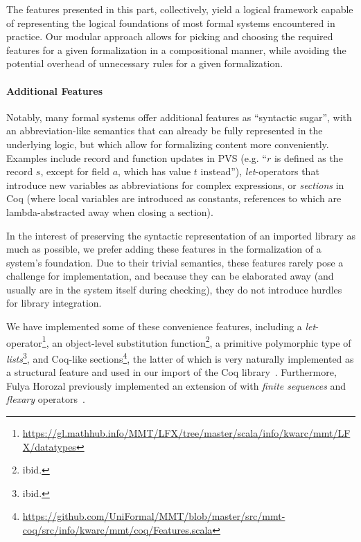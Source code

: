 The features presented in this part, collectively, yield a logical framework capable of representing the logical foundations of most formal systems encountered in practice. Our modular approach allows for picking and choosing the required features for a given formalization in a compositional manner, while avoiding the potential overhead of unnecessary rules for a given formalization.\medskip


\paragraph{Additional Features} Notably, many formal systems offer additional features as ``syntactic sugar'', with an abbreviation-like semantics that can already be fully represented in the underlying logic, but which allow for formalizing content more conveniently. Examples include record and function updates in PVS (e.g. ``$r$ is defined as the record $s$, except for field $a$, which has value $t$ instead''), \emph{let}-operators that introduce new variables as abbreviations for complex expressions, or \emph{sections} in Coq (where local variables are introduced as constants, references to which are lambda-abstracted away when closing a section).

In the interest of preserving the syntactic representation of an imported library as much as possible, we prefer adding these features in the formalization of a system's foundation. Due to their trivial semantics, these features rarely pose a challenge for implementation, and because they can be elaborated away (and usually are in the system itself during checking), they do not introduce hurdles for library integration.

We have implemented some of these convenience features, including a \emph{let}-operator\footnote{\url{https://gl.mathhub.info/MMT/LFX/tree/master/scala/info/kwarc/mmt/LFX/datatypes}}, an object-level substitution function\footnote{ibid.}, a primitive polymorphic type of \emph{lists}\footnote{ibid.}, and Coq-like sections\footnote{\url{https://github.com/UniFormal/MMT/blob/master/src/mmt-coq/src/info/kwarc/mmt/coq/Features.scala}}, the latter of which is very naturally implemented as a structural feature and used in our import of the Coq library~\cite{coqmmt}. Furthermore, Fulya Horozal previously implemented an extension of \LF with \emph{finite sequences} and \emph{flexary} operators~\cite{Horozal:afddl14}.
\medskip

